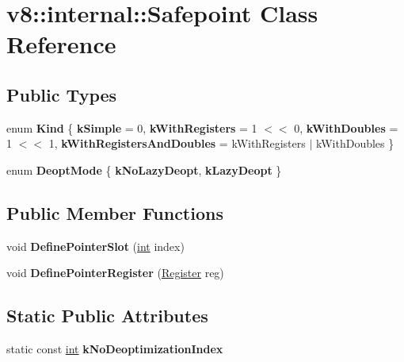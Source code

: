 \hypertarget{classv8_1_1internal_1_1Safepoint}{}\section{v8\+:\+:internal\+:\+:Safepoint Class Reference}
\label{classv8_1_1internal_1_1Safepoint}
\subsection*{Public Types}
\begin{DoxyCompactItemize}
\item 
\mbox{\label{classv8_1_1internal_1_1Safepoint_abd8d805eb3f6987595279455edc5a97d}} 
enum {\bfseries Kind} \{ {\bfseries k\+Simple} = 0, 
{\bfseries k\+With\+Registers} = 1 $<$$<$ 0, 
{\bfseries k\+With\+Doubles} = 1 $<$$<$ 1, 
{\bfseries k\+With\+Registers\+And\+Doubles} = k\+With\+Registers $\vert$ k\+With\+Doubles
 \}
\item 
\mbox{\label{classv8_1_1internal_1_1Safepoint_a6a8989f5aff011b748a09f941f38fd09}} 
enum {\bfseries Deopt\+Mode} \{ {\bfseries k\+No\+Lazy\+Deopt}, 
{\bfseries k\+Lazy\+Deopt}
 \}
\end{DoxyCompactItemize}
\subsection*{Public Member Functions}
\begin{DoxyCompactItemize}
\item 
\mbox{\label{classv8_1_1internal_1_1Safepoint_a52bb658b33baae5aeab365ae8c99d011}} 
void {\bfseries Define\+Pointer\+Slot} (\mbox{\hyperlink{classint}{int}} index)
\item 
\mbox{\label{classv8_1_1internal_1_1Safepoint_ab606af1c9ccbb05cf0cedee02deed48e}} 
void {\bfseries Define\+Pointer\+Register} (\mbox{\hyperlink{classv8_1_1internal_1_1Register}{Register}} reg)
\end{DoxyCompactItemize}
\subsection*{Static Public Attributes}
\begin{DoxyCompactItemize}
\item 
static const \mbox{\hyperlink{classint}{int}} {\bfseries k\+No\+Deoptimization\+Index}
\end{DoxyCompactItemize}
